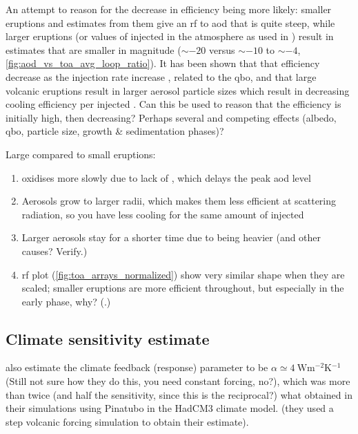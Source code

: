 \documentclass{ametsocV5}
\newcommand{\iso}[1][i]{{#1}njected \ce{SO2}}
\begin{document}
An attempt to reason for the decrease in efficiency being more likely: smaller eruptions
and estimates from them give an \acrshort{rf} to \acrshort{aod} that is quite steep,
while larger eruptions (or values of \iso{} in the atmosphere as used in
\citet{niemeier2015}) result in estimates that are smaller in magnitude (\(\sim-20\)
versus \(\sim-10\) to \(\sim-4\), \cref{fig:aod_vs_toa_avg_loop_ratio}). It has been
shown that that efficiency decrease as the injection rate increase \citep{niemeier2017},
related to the \acrshort{qbo}, and that large volcanic eruptions result in larger
aerosol particle sizes which result in decreasing cooling efficiency per \iso{}
\citep{english2013, timmreck2018}. Can this be used to reason that the efficiency is
initially high, then decreasing? Perhaps several and competing effects (albedo,
\acrshort{qbo}, particle size, growth \& sedimentation phases)?

Large compared to small eruptions:

\begin{enumerate}
  \item {} oxidises more slowly due to lack of , which delays the peak
        \acrshort{aod} level
  \item Aerosols grow to larger radii, which makes them less efficient at scattering radiation,
        so you have less cooling for the same amount of \iso{}
  \item Larger aerosols stay for a shorter time due to being heavier (and other causes? Verify.)
  \item \acrshort{rf} plot (\cref{fig:toa_arrays_normalized}) show very similar shape
        when they are scaled; smaller eruptions are more efficient throughout, but
        especially in the early phase, why? (.)
\end{enumerate}

\subsection{Climate sensitivity estimate}

\citet{jones2005} also estimate the climate feedback (response) parameter to be \(\alpha
\simeq \SI{4}{\watt\metre^{-2}\kelvin^{-1}}\) (Still not sure how they do this, you need
constant forcing, no?), which was more than twice (and half the sensitivity, since this
is the reciprocal?) what \citet{gregory2016} obtained in
their simulations using Pinatubo in the HadCM3 climate model. (they used a step volcanic
forcing simulation to obtain their estimate).
\end{document}
